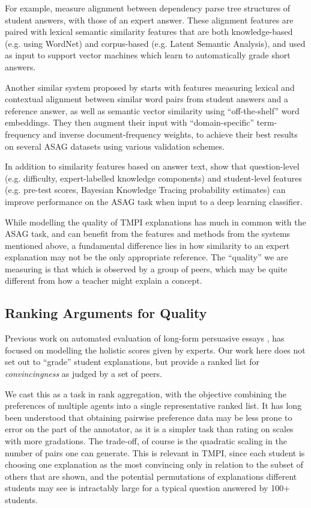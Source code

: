 \documentclass[notitlepage,12pt]{jedm}
\begin{document}
For example, \cite{mohler_learning_2011} measure alignment between dependency 
parse tree structures of student answers, with those of an expert answer.
These alignment features are paired with lexical semantic similarity features 
that are both knowledge-based (e.g. using WordNet) and corpus-based (e.g. 
Latent Semantic Analysis), and used as input to support vector machines which 
learn to automatically grade short answers.

Another similar system proposed by \cite{sultan_fast_2016} starts with features 
measuring lexical and contextual alignment between similar word pairs from 
student answers and a reference answer, as well as semantic vector similarity 
using ``off-the-shelf'' word embeddings.  
They then augment their input with  ``domain-specific'' term-frequency and 
inverse document-frequency weights, to achieve their best results on several 
ASAG datasets using various validation schemes.
 
In addition to similarity features based on answer text, \cite{zhang_deep_2016} 
show that question-level (e.g. difficulty, expert-labelled knowledge 
components) and student-level features (e.g. pre-test scores, Bayesian 
Knowledge Tracing probability estimates) can improve performance on the ASAG 
task when input to a deep learning classifier.

While modelling the quality of TMPI explanations has much in common with the 
ASAG task, and can benefit from the features and methods from the systems 
mentioned above, a fundamental difference lies in how similarity to an expert 
explanation may not be the only appropriate reference.
The ``quality'' we are measuring is that which is observed by a group of peers, 
which may be quite different from how a teacher might explain a concept.

\subsection{Ranking Arguments for Quality}\label{sec:related_work:arg_quality}

Previous work on automated evaluation of long-form persuasive essays 
\cite{ghosh_coarse-grained_2016}, \cite{klebanov_argumentation_2016} 
\cite{nguyen_argument_2018} has focused on modelling the holistic scores given 
by experts.
Our work here does not set out to ``grade'' student explanations, but provide a 
ranked list for \textit{convincingness} as judged by a set of peers.

We cast this as a task in rank aggregation, with the objective combining the 
preferences of multiple agents into a single representative ranked list.
It has long been understood that obtaining pairwise preference data may be 
less prone to error on the part of the annotator, as it is a simpler task than 
rating on scales with more gradations.
The trade-off, of course is the quadratic scaling in the number of pairs one 
can generate. 
This is relevant in TMPI, since each student is choosing one explanation as 
the most convincing only in relation to the subset of others that are shown, 
and the potential permutations of explanations different students may see is 
intractably large for a typical question answered by 100+ students.
\end{document}
